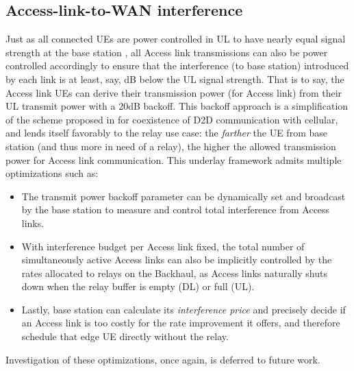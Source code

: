 \documentclass[journal]{IEEEtran}
\begin{document}



\subsection{Access-link-to-WAN interference}
Just as all connected UEs are power controlled in UL to have nearly equal signal strength at the base station \cite[pp.~464-471]{SesTouBak09}, all Access link transmissions can also be power controlled accordingly to ensure that the interference (to base station) introduced by each link is at least, say, dB below the UL signal strength.   That is to say, the Access link UEs can derive their transmission power (for Access link) from their UL transmit power with a 20dB backoff.  This backoff approach is a simplification of the scheme proposed in \cite{JanisYuDoppler09} for coexistence of D2D communication with cellular, and lends itself favorably to the relay use case: the {\em farther} the UE from base station (and thus more in need of a relay), the higher the allowed transmission power for Access link communication.  This underlay framework admits multiple optimizations such as:
\begin{itemize}
    \item The transmit power backoff parameter can be dynamically set and broadcast by the base station to measure and control total interference from Access links.
    \item With interference budget per Access link fixed, the total number of simultaneously active Access links can also be implicitly controlled by the rates allocated to relays on the Backhaul, as Access links naturally shuts down when the relay buffer is empty (DL) or full (UL).
    \item Lastly, base station can calculate its {\em interference price} and precisely decide if an Access link is too costly for the rate improvement it offers, and therefore schedule that edge UE directly without the relay.
\end{itemize}
Investigation of these optimizations, once again, is deferred to future work.
\end{document}
